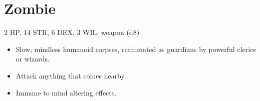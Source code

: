 \documentclass[
  10pt,
  american,
]{article}
\begin{document}
\hypertarget{zombie}{%
\section{Zombie}\label{zombie}}

2 HP, 14 STR, 6 DEX, 3 WIL, weapon (d8)

\begin{samepage}
\begin{itemize}
\setlength\itemsep{-.5em}
\item Slow, mindless humanoid corpses, reanimated as guardians by  powerful clerics or wizards.
\item Attack anything that comes nearby.
\item Immune to mind altering effects.
\end{itemize}
\end{samepage}
\end{document}
